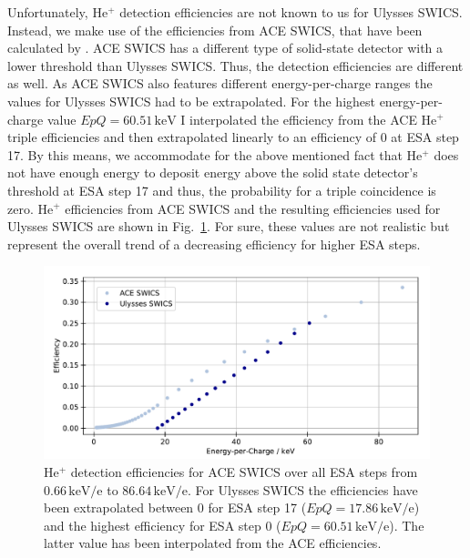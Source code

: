 Unfortunately, $\mathrm{He^{+}}$ detection efficiencies are not known to us for Ulysses SWICS. Instead, we make use of the efficiencies from ACE SWICS, that have been calculated by \citet{koeten}. ACE SWICS has a different type of solid-state detector with a lower threshold than Ulysses SWICS. Thus, the detection efficiencies are different as well. As ACE SWICS also features different energy-per-charge ranges the values for Ulysses SWICS had to be extrapolated. For the highest energy-per-charge value $EpQ = 60.51\,\mathrm{keV}$ I interpolated the efficiency from the ACE $\mathrm{He^{+}}$ triple efficiencies and then extrapolated linearly to an efficiency of 0 at ESA step 17. By this means, we accommodate for the above mentioned fact that $\mathrm{He^{+}}$ does not have enough energy to deposit energy above the solid state detector's threshold at ESA step 17 and thus, the probability for a triple coincidence is zero. $\mathrm{He^{+}}$ efficiencies from ACE SWICS and the resulting efficiencies used for Ulysses SWICS are shown in Fig.~\ref{fig:guess_eff}. For sure, these values are not realistic but represent the overall trend of a decreasing efficiency for higher ESA steps.
\begin{figure}[h]
	\includegraphics[width=1.\textwidth]{Figures/guess_eff.pdf}
	\centering
	\caption{$\mathrm{He^{+}}$ detection efficiencies for ACE SWICS over all ESA steps from $0.66\,\mathrm{keV/e}$ to $86.64\,\mathrm{keV/e}$. For Ulysses SWICS the efficiencies have been extrapolated between 0 for ESA step 17 ($EpQ = 17.86\,\mathrm{keV/e}$) and the highest efficiency for ESA step 0 ($EpQ =60.51\,\mathrm{keV/e}$). The latter value has been interpolated from the ACE efficiencies.}
	\label{fig:guess_eff}
\end{figure}


